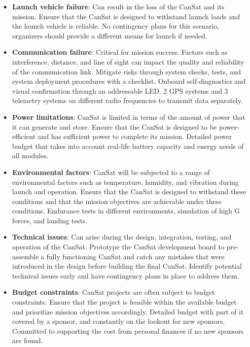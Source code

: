 \documentclass[11pt]{article}
\begin{document}
\begin{itemize}[leftmargin=1cm, itemindent=0.25cm, noitemsep, topsep=0pt, label=$\bullet$]
\item \textbf{Launch vehicle failure}: Can result in the loss of the CanSat and its mission. Ensure that the CanSat is designed to withstand launch loads and the launch vehicle is reliable. No contingency plans for this scenario, organizers should provide a different means for launch if needed.
\item \textbf{Communication failure}: Critical for mission success. Factors such as interference, distance, and line of sight can impact the quality and reliability of the communication link. Mitigate risks through system checks, tests, and system deployment procedures with a checklist. Onboard self-diagnostics and visual confirmation through an addressable LED. 2 GPS systems and 3 telemetry systems on different radio frequencies to transmit data separately.
\item \textbf{Power limitations}: CanSat is limited in terms of the amount of power that it can generate and store. Ensure that the CanSat is designed to be power-efficient and has sufficient power to complete its mission. Detailed power budget that takes into account real-life battery capacity and energy needs of all modules.
\item \textbf{Environmental factors}: CanSat will be subjected to a range of environmental factors such as temperature, humidity, and vibration during launch and operation. Ensure that the CanSat is designed to withstand these conditions and that the mission objectives are achievable under these conditions. Endurance tests in different environments, simulation of high G forces, and landing tests.
\item \textbf{Technical issues}: Can arise during the design, integration, testing, and operation of the CanSat. Prototype the CanSat development board to pre-assemble a fully functioning CanSat and catch any mistakes that were introduced in the design before building the final CanSat. Identify potential technical issues early and have contingency plans in place to address them. 
\item \textbf{Budget constraints}: CanSat projects are often subject to budget constraints. Ensure that the project is feasible within the available budget and prioritize mission objectives accordingly. Detailed budget with part of it covered by a sponsor, and constantly on the lookout for new sponsors. Committed to supporting the cost from personal finances if no new sponsors are found.
\end{itemize}
\end{document}
